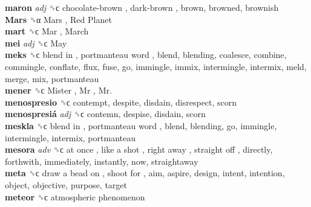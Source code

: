\textbf{maron} \emph{adj}  ␝ϲ   chocolate-brown ,  dark-brown , brown, browned, brownish  \\
\textbf{Mars} ␝α   Mars ,  Red Planet   \\
\textbf{mart} ␝ϲ   Mar ,  March   \\
\textbf{mei} \emph{adj}  ␝ϲ   May   \\
\textbf{meks} ␝ϲ   blend in ,  portmanteau word , blend, blending, coalesce, combine, commingle, conflate, flux, fuse, go, immingle, immix, intermingle, intermix, meld, merge, mix, portmanteau  \\
\textbf{mener} ␝ϲ   Mister ,  Mr ,  Mr.   \\
\textbf{menospresio} ␝ϲ  contempt, despite, disdain, disrespect, scorn  \\
\textbf{menospresiá} \emph{adj}  ␝ϲ  contemn, despise, disdain, scorn  \\
\textbf{meskla} ␝ϲ   blend in ,  portmanteau word , blend, blending, go, immingle, intermingle, intermix, portmanteau  \\
\textbf{mesora} \emph{adv}  ␝ϲ   at once ,  like a shot ,  right away ,  straight off , directly, forthwith, immediately, instantly, now, straightaway  \\
\textbf{meta} ␝ϲ   draw a bead on ,  shoot for , aim, aspire, design, intent, intention, object, objective, purpose, target  \\
\textbf{meteor} ␝ϲ   atmospheric phenomenon   \\
